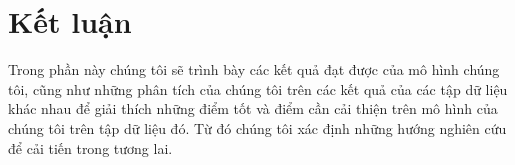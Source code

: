 \chapter{Kết luận}
\label{chap:Conclusion}

Trong phần này chúng tôi sẽ trình bày các kết quả đạt được của mô hình chúng tôi, cũng như những phân tích của chúng tôi
trên các kết quả của các tập dữ liệu khác nhau để giải thích những điểm tốt và điểm cần cải thiện trên mô hình của chúng tôi trên tập dữ liệu đó. Từ đó chúng tôi xác định những hướng nghiên cứu để cải tiến trong tương lai.

